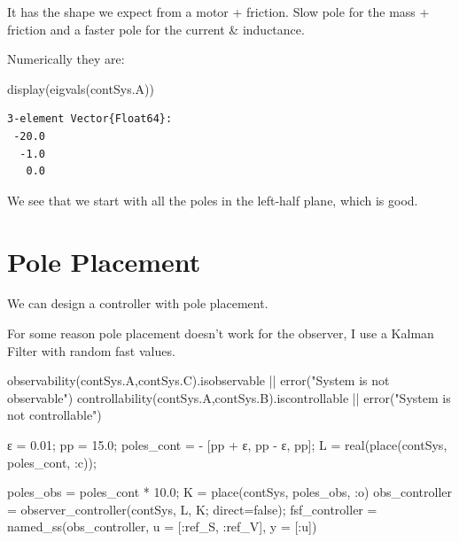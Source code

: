 \documentclass[
  8pt,
  a4paper,
]{book}
\newenvironment{Shaded}{\begin{snugshade}}{\end{snugshade}}
\newcommand{\ConstantTok}[1]{\textcolor[rgb]{0.56,0.35,0.01}{#1}}
\newcommand{\FloatTok}[1]{\textcolor[rgb]{0.68,0.00,0.00}{#1}}
\newcommand{\FunctionTok}[1]{\textcolor[rgb]{0.28,0.35,0.67}{#1}}
\newcommand{\NormalTok}[1]{\textcolor[rgb]{0.00,0.23,0.31}{#1}}
\newcommand{\OperatorTok}[1]{\textcolor[rgb]{0.37,0.37,0.37}{#1}}
\newcommand{\StringTok}[1]{\textcolor[rgb]{0.13,0.47,0.30}{#1}}
\begin{document}
It has the shape we expect from a motor + friction. Slow pole for the
mass + friction and a faster pole for the current \& inductance.

Numerically they are:

\begin{Shaded}
\begin{Highlighting}[]
\FunctionTok{display}\NormalTok{(}\FunctionTok{eigvals}\NormalTok{(contSys.A))}
\end{Highlighting}
\end{Shaded}

\begin{verbatim}
3-element Vector{Float64}:
 -20.0
  -1.0
   0.0
\end{verbatim}

We see that we start with all the poles in the left-half plane, which is
good.

\section{Pole Placement}\label{pole-placement-2}

We can design a controller with pole placement.

For some reason pole placement doesn't work for the observer, I use a
Kalman Filter with random fast values.

\begin{Shaded}
\begin{Highlighting}[]
\FunctionTok{observability}\NormalTok{(contSys.A,contSys.C).isobservable }\OperatorTok{||} \FunctionTok{error}\NormalTok{(}\StringTok{"System is not observable"}\NormalTok{)}
\FunctionTok{controllability}\NormalTok{(contSys.A,contSys.B).iscontrollable }\OperatorTok{||} \FunctionTok{error}\NormalTok{(}\StringTok{"System is not controllable"}\NormalTok{)}

\NormalTok{ε }\OperatorTok{=} \FloatTok{0.01}\NormalTok{;}
\NormalTok{pp }\OperatorTok{=} \FloatTok{15.0}\NormalTok{;}
\NormalTok{poles\_cont }\OperatorTok{=} \OperatorTok{{-}}\NormalTok{ [pp }\OperatorTok{+}\NormalTok{ ε, pp }\OperatorTok{{-}}\NormalTok{ ε, pp];}
\NormalTok{L }\OperatorTok{=} \FunctionTok{real}\NormalTok{(}\FunctionTok{place}\NormalTok{(contSys, poles\_cont, }\OperatorTok{:}\NormalTok{c));}


\NormalTok{poles\_obs }\OperatorTok{=}\NormalTok{ poles\_cont }\OperatorTok{*} \FloatTok{10.0}\NormalTok{;}
\NormalTok{K }\OperatorTok{=} \FunctionTok{place}\NormalTok{(contSys, poles\_obs, }\OperatorTok{:}\NormalTok{o)}
\NormalTok{obs\_controller }\OperatorTok{=} \FunctionTok{observer\_controller}\NormalTok{(contSys, L, K; direct}\OperatorTok{=}\ConstantTok{false}\NormalTok{);}
\NormalTok{fsf\_controller }\OperatorTok{=} \FunctionTok{named\_ss}\NormalTok{(obs\_controller, u }\OperatorTok{=}\NormalTok{ [}\OperatorTok{:}\NormalTok{ref\_S, }\OperatorTok{:}\NormalTok{ref\_V], y }\OperatorTok{=}\NormalTok{ [}\OperatorTok{:}\NormalTok{u])}
\end{Highlighting}
\end{Shaded}
\end{document}
